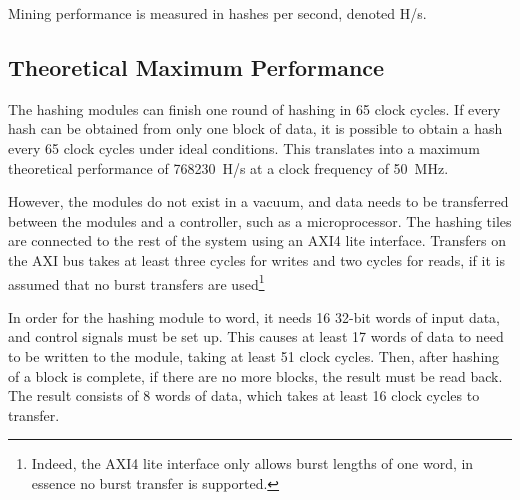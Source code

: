 Mining performance is measured in hashes per second, denoted H/s.


%
%

\subsection{Theoretical Maximum Performance}

The hashing modules can finish one round of hashing in 65 clock cycles. If
every hash can be obtained from only one block of data, it is possible to
obtain a hash every 65 clock cycles under ideal conditions. This translates
into a maximum theoretical performance of 768230~H/s at a clock frequency of
50~MHz.

However, the modules do not exist in a vacuum, and data needs to be transferred
between the modules and a controller, such as a microprocessor. The hashing tiles
are connected to the rest of the system using an AXI4 lite interface. Transfers
on the AXI bus takes at least three cycles for writes and two cycles for reads,
if it is assumed that no burst transfers are used\footnote{Indeed, the AXI4 lite
interface only allows burst lengths of one word, in essence no burst transfer is
supported.}

In order for the hashing module to word, it needs 16 32-bit words of input data,
and control signals must be set up. This causes at least 17 words of data to
need to be written to the module, taking at least 51 clock cycles. Then, after
hashing of a block is complete, if there are no more blocks, the result must
be read back. The result consists of 8 words of data, which takes at least 16
clock cycles to transfer.

